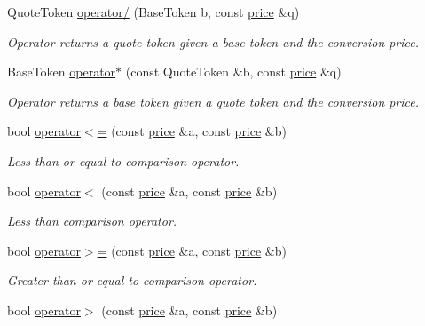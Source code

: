 \begin{DoxyCompactItemize}
\item 
Quote\+Token \mbox{\hyperlink{structaacio_1_1price_a00f8a553edbab3956c82bdd37d435395}{operator/}} (Base\+Token b, const \mbox{\hyperlink{structaacio_1_1price}{price}} \&q)
\begin{DoxyCompactList}\small\item\em Operator returns a quote token given a base token and the conversion price. \end{DoxyCompactList}\item 
Base\+Token \mbox{\hyperlink{structaacio_1_1price_ab3db8af0092dbe87a5dab8505052a750}{operator$\ast$}} (const Quote\+Token \&b, const \mbox{\hyperlink{structaacio_1_1price}{price}} \&q)
\begin{DoxyCompactList}\small\item\em Operator returns a base token given a quote token and the conversion price. \end{DoxyCompactList}\item 
bool \mbox{\hyperlink{structaacio_1_1price_a9a92923bb6a379671facc88b8f33e1f8}{operator$<$=}} (const \mbox{\hyperlink{structaacio_1_1price}{price}} \&a, const \mbox{\hyperlink{structaacio_1_1price}{price}} \&b)
\begin{DoxyCompactList}\small\item\em Less than or equal to comparison operator. \end{DoxyCompactList}\item 
bool \mbox{\hyperlink{structaacio_1_1price_aa6a0b37090470580bca05624bd5da0a3}{operator$<$}} (const \mbox{\hyperlink{structaacio_1_1price}{price}} \&a, const \mbox{\hyperlink{structaacio_1_1price}{price}} \&b)
\begin{DoxyCompactList}\small\item\em Less than comparison operator. \end{DoxyCompactList}\item 
bool \mbox{\hyperlink{structaacio_1_1price_aa0f3fb89fde51f4f9b728e51b459abf6}{operator$>$=}} (const \mbox{\hyperlink{structaacio_1_1price}{price}} \&a, const \mbox{\hyperlink{structaacio_1_1price}{price}} \&b)
\begin{DoxyCompactList}\small\item\em Greater than or equal to comparison operator. \end{DoxyCompactList}\item 
bool \mbox{\hyperlink{structaacio_1_1price_a1d386990660f40b6cd35f5da903b9d3e}{operator$>$}} (const \mbox{\hyperlink{structaacio_1_1price}{price}} \&a, const \mbox{\hyperlink{structaacio_1_1price}{price}} \&b)

\end{DoxyCompactItemize}
